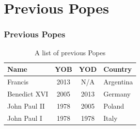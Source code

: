 \documentclass[hyperref=bookmarks]{beamer}
\begin{document}
	\section{Previous Popes}
	\begin{frame}[fragile]
		\frametitle{Previous Popes}

		\begin{table}
			\centering
			\begin{tabular}{lccl}
				\toprule
				Name & YOB & YOD & Country \\
				\midrule
				Francis & 2013 & N/A & Argentina \\
				Benedict XVI & 2005 & 2013 & Germany \\
				John Paul II & 1978 & 2005 & Poland \\
				John Paul I & 1978 & 1978 & Italy \\
				\bottomrule
			\end{tabular}
			\caption{A list of previous Popes}
			\label{tab:the-popes1}
		\end{table}

	\end{frame}
\end{document}
